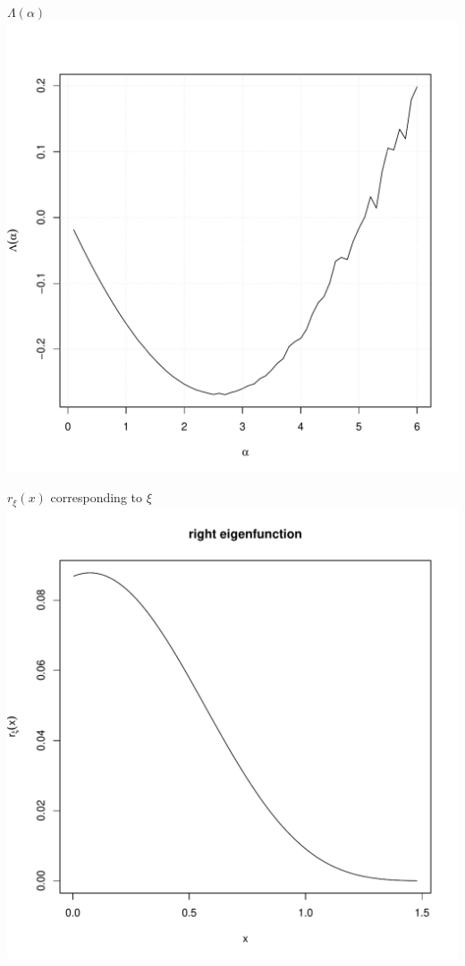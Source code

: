 \documentclass[aoas,preprint]{imsart}
\numberwithin{equation}{section}
\theoremstyle{plain}
\begin{document}
\begin{itemize}
  \begin{minipage}{0.5\linewidth}
    \centering
    $\Lambda(\alpha)$
    \includegraphics[width=\textwidth]{SP500_xi.pdf}
  \end{minipage}\hfill
  \begin{minipage}{0.5\linewidth}
    \centering
    $r_\xi(x)$ corresponding to $\xi$
    \includegraphics[width=\textwidth]{SP500_r.pdf}
  \end{minipage}
  
  
\end{itemize}
\end{document}
